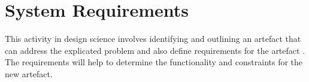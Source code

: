 \section{System Requirements}
This activity in design science involves identifying and outlining an artefact that can address the explicated problem and also define requirements for the artefact \cite{johannesson2012design}. The requirements will help to determine the functionality and constraints for the new artefact. 

%
%


